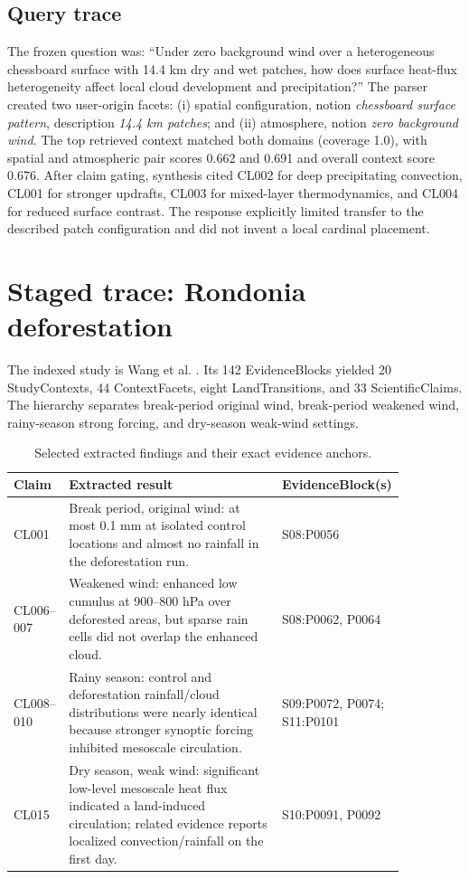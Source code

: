 \subsection{Query trace}
The frozen question was: ``Under zero background wind over a heterogeneous chessboard surface with 14.4 km dry and wet patches, how does surface heat-flux heterogeneity affect local cloud development and precipitation?'' The parser created two user-origin facets: (i) spatial configuration, notion \emph{chessboard surface pattern}, description \emph{14.4 km patches}; and (ii) atmosphere, notion \emph{zero background wind}. The top retrieved context matched both domains (coverage 1.0), with spatial and atmospheric pair scores 0.662 and 0.691 and overall context score 0.676. After claim gating, synthesis cited CL002 for deep precipitating convection, CL001 for stronger updrafts, CL003 for mixed-layer thermodynamics, and CL004 for reduced surface contrast. The response explicitly limited transfer to the described patch configuration and did not invent a local cardinal placement.

\section{Staged trace: Rondonia deforestation}
The indexed study is Wang et al. \citep{wang2000}. Its 142 EvidenceBlocks yielded 20 StudyContexts, 44 ContextFacets, eight LandTransitions, and 33 ScientificClaims. The hierarchy separates break-period original wind, break-period weakened wind, rainy-season strong forcing, and dry-season weak-wind settings.

\begin{table}[h]
\centering\small
\caption{Selected extracted findings and their exact evidence anchors.}
\begin{tabular}{p{0.12\linewidth}p{0.54\linewidth}p{0.20\linewidth}}
\toprule
Claim & Extracted result & EvidenceBlock(s) \\
\midrule
CL001 & Break period, original wind: at most 0.1 mm at isolated control locations and almost no rainfall in the deforestation run. & S08:P0056 \\
CL006--007 & Weakened wind: enhanced low cumulus at 900--800 hPa over deforested areas, but sparse rain cells did not overlap the enhanced cloud. & S08:P0062, P0064 \\
CL008--010 & Rainy season: control and deforestation rainfall/cloud distributions were nearly identical because stronger synoptic forcing inhibited mesoscale circulation. & S09:P0072, P0074; S11:P0101 \\
CL015 & Dry season, weak wind: significant low-level mesoscale heat flux indicated a land-induced circulation; related evidence reports localized convection/rainfall on the first day. & S10:P0091, P0092 \\
\bottomrule
\end{tabular}
\end{table}


